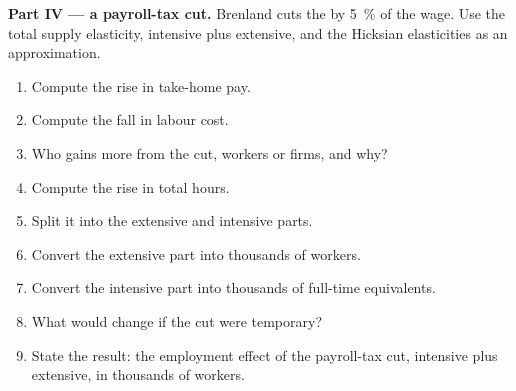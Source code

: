 \begin{problem}
\medskip\noindent\textbf{Part IV --- a payroll-tax cut.} Brenland cuts the 
by 5~\% of the wage. Use the total supply elasticity, intensive plus extensive, and
the Hicksian elasticities as an approximation.
\begin{enumerate}[resume]
\item Compute the rise in take-home pay.
\item Compute the fall in labour cost.
\item Who gains more from the cut, workers or firms, and why?
\item Compute the rise in total hours.
\item Split it into the extensive and intensive parts.
\item Convert the extensive part into thousands of workers.
\item Convert the intensive part into thousands of full-time equivalents.
\item What would change if the cut were temporary?
\item State the result: the employment effect of the payroll-tax cut, intensive plus
extensive, in thousands of workers.
\end{enumerate}
\end{problem}
